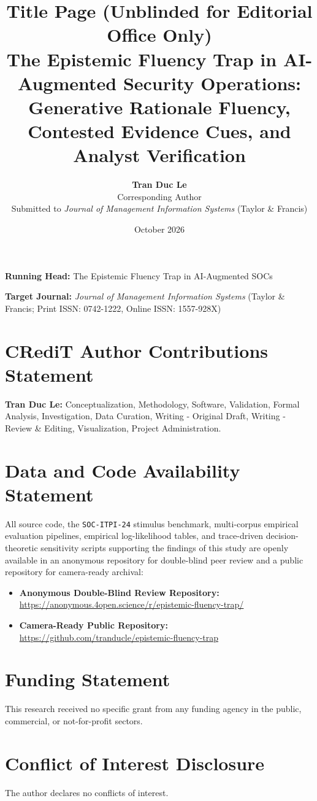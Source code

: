 \documentclass[11pt,a4paper]{article}
\title{\textbf{Title Page (Unblinded for Editorial Office Only)}\\[0.5em]
\large The Epistemic Fluency Trap in AI-Augmented Security Operations: Generative Rationale Fluency, Contested Evidence Cues, and Analyst Verification}
\author{
  \textbf{Tran Duc Le}\\
  Corresponding Author\\
  \small Submitted to \textit{Journal of Management Information Systems} (Taylor \& Francis)
}
\date{October 2026}
\begin{document}
\maketitle
\thispagestyle{empty}

\noindent\textbf{Running Head:} The Epistemic Fluency Trap in AI-Augmented SOCs

\medskip
\noindent\textbf{Target Journal:} \textit{Journal of Management Information Systems} (Taylor \& Francis; Print ISSN: 0742-1222, Online ISSN: 1557-928X)

\section*{CRediT Author Contributions Statement}
\textbf{Tran Duc Le:} Conceptualization, Methodology, Software, Validation, Formal Analysis, Investigation, Data Curation, Writing - Original Draft, Writing - Review \& Editing, Visualization, Project Administration.

\section*{Data and Code Availability Statement}
All source code, the \texttt{SOC-ITPI-24} stimulus benchmark, multi-corpus empirical evaluation pipelines, empirical log-likelihood tables, and trace-driven decision-theoretic sensitivity scripts supporting the findings of this study are openly available in an anonymous repository for double-blind peer review and a public repository for camera-ready archival:
\begin{itemize}
  \item \textbf{Anonymous Double-Blind Review Repository:}\\
  \url{https://anonymous.4open.science/r/epistemic-fluency-trap/}
  \item \textbf{Camera-Ready Public Repository:}\\
  \url{https://github.com/tranducle/epistemic-fluency-trap}
\end{itemize}

\section*{Funding Statement}
This research received no specific grant from any funding agency in the public, commercial, or not-for-profit sectors.

\section*{Conflict of Interest Disclosure}
The author declares no conflicts of interest.
\end{document}
